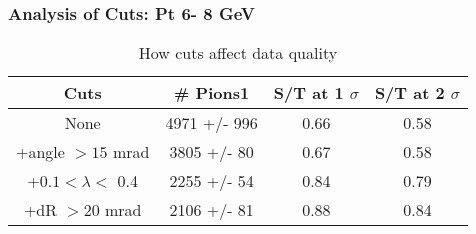 \frame
{
\frametitle{Analysis of Cuts: Pt  6- 8 GeV}
\begin{table}
\caption{How cuts affect data quality}
\centering
\begin{tabular}{c c c c}
\hline\hline
Cuts & \# Pions1 & S/T at 1 $\sigma$ & S/T at 2 $\sigma$ \\ [0.5ex]
\hline
None & 4971 +/-  996 & 0.66 & 0.58 \\ %
+angle $> 15$ mrad & 3805 +/-   80 & 0.67 & 0.58 \\ %
+$0.1 < \lambda <$ 0.4 & 2255 +/-   54 & 0.84 & 0.79 \\ %
+dR $> 20$ mrad & 2106 +/-   81 & 0.88 & 0.84 \\ %
[1ex]
\hline
\end{tabular}
\label{table:nonlin}
\end{table}
}
